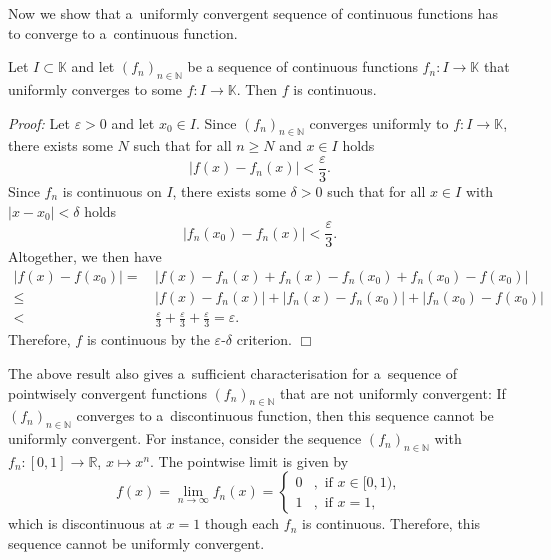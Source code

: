 

Now we show that a~uniformly convergent sequence of continuous functions has to converge to a~continuous function.
\begin{Theorem}{}\label{th:uniform_conv}
 Let $I\subset \mathbb{K}$ and let $(f_n)_{n\in\mathbb{N}}$ be a sequence of continuous functions $f_n:I\to\mathbb{K}$ that uniformly converges to some $f:I\to\mathbb{K}$. 
Then $f$ is continuous.
\end{Theorem}

{\em Proof:} Let $\varepsilon>0$ and let $x_0\in I$.
Since $(f_n)_{n\in\mathbb{N}}$ converges uniformly to $f:I\to\mathbb{K}$, there exists some $N$ such that for all $n\geq N$ and $x\in I$ holds
\[|f(x)-f_n(x)|<\frac\varepsilon3.\]
Since $f_n$ is continuous on $I$, there exists some $\delta>0$ such that for all $x\in I$ with $|x-x_0|<\delta$ holds
\[|f_n(x_0)-f_n(x)|<\frac\varepsilon3.\]
Altogether, we then have
\[
\begin{aligned}
|f(x)-f(x_0)|=&\,|f(x)-f_n(x)+f_n(x)-f_n(x_0)+f_n(x_0)-f(x_0)|\\
\leq &\,|f(x)-f_n(x)|+|f_n(x)-f_n(x_0)|+|f_n(x_0)-f(x_0)|\\
< &\,\frac\varepsilon3+\frac\varepsilon3+\frac\varepsilon3=\varepsilon.
\end{aligned}
\]
Therefore, $f$ is continuous by the $\varepsilon$-$\delta$ criterion.
$\Box$

\begin{Remark}{}
The above result also gives a~sufficient characterisation for a~sequence of pointwisely convergent functions $(f_n)_{n\in\mathbb{N}}$ that are not uniformly convergent: If $(f_n)_{n\in\mathbb{N}}$ converges to a~discontinuous function,
then this sequence cannot be uniformly convergent. For instance, consider the sequence $(f_n)_{n\in\mathbb{N}}$ with $f_n:[0,1]\to\mathbb{R}$, $x\mapsto x^n$. The pointwise limit
is given by
\[f(x)=\lim_{n\to\infty}f_n(x)=\begin{cases}0&,\text{ if }x\in[0,1),\\1&,\text{ if }x=1,\end{cases}\]
which is discontinuous at $x=1$ though each $f_n$ is continuous. Therefore, this sequence cannot be uniformly convergent.
\end{Remark}

